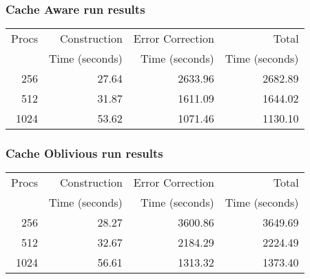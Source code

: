 \documentclass[integrals, nointegrals, article, 12pt, a4paper]{article}
\begin{document}
\subsubsection{Cache Aware run results}
\label{sec-3-5-3}

\begin{center}
\begin{tabular}{rrrr}
\hline
Procs & Construction & Error Correction & Total\\
 & Time (seconds) & Time (seconds) & Time (seconds)\\
\hline
256 & 27.64 & 2633.96 & 2682.89\\
512 & 31.87 & 1611.09 & 1644.02\\
1024 & 53.62 & 1071.46 & 1130.10\\
\hline
\end{tabular}
\end{center}
\subsubsection{Cache Oblivious run results}
\label{sec-3-5-4}

\begin{center}
\begin{tabular}{rrrr}
\hline
Procs & Construction & Error Correction & Total\\
 & Time (seconds) & Time (seconds) & Time (seconds)\\
\hline
256 & 28.27 & 3600.86 & 3649.69\\
512 & 32.67 & 2184.29 & 2224.49\\
1024 & 56.61 & 1313.32 & 1373.40\\
\hline
\end{tabular}
\end{center}
\end{document}
